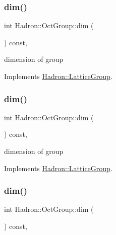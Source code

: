 \subsubsection{\texorpdfstring{dim()}{dim()}\hspace{0.1cm}{\footnotesize\ttfamily [1/3]}}
{\footnotesize\ttfamily int Hadron\+::\+Oct\+Group\+::dim (\begin{DoxyParamCaption}{ }\end{DoxyParamCaption}) const\hspace{0.3cm}{\ttfamily [inline]}, {\ttfamily [virtual]}}

dimension of group 

Implements \mbox{\hyperlink{structHadron_1_1LatticeGroup_abd8415698323796ef6a8605796ee3bea}{Hadron\+::\+Lattice\+Group}}.

\mbox{\label{structHadron_1_1OctGroup_a1db49add38b9263bfd536b3da0cc1566}} 
\subsubsection{\texorpdfstring{dim()}{dim()}\hspace{0.1cm}{\footnotesize\ttfamily [2/3]}}
{\footnotesize\ttfamily int Hadron\+::\+Oct\+Group\+::dim (\begin{DoxyParamCaption}{ }\end{DoxyParamCaption}) const\hspace{0.3cm}{\ttfamily [inline]}, {\ttfamily [virtual]}}

dimension of group 

Implements \mbox{\hyperlink{structHadron_1_1LatticeGroup_abd8415698323796ef6a8605796ee3bea}{Hadron\+::\+Lattice\+Group}}.

\mbox{\label{structHadron_1_1OctGroup_a1db49add38b9263bfd536b3da0cc1566}} 
\subsubsection{\texorpdfstring{dim()}{dim()}\hspace{0.1cm}{\footnotesize\ttfamily [3/3]}}
{\footnotesize\ttfamily int Hadron\+::\+Oct\+Group\+::dim (\begin{DoxyParamCaption}{ }\end{DoxyParamCaption}) const\hspace{0.3cm}{\ttfamily [inline]}, {\ttfamily [virtual]}}

